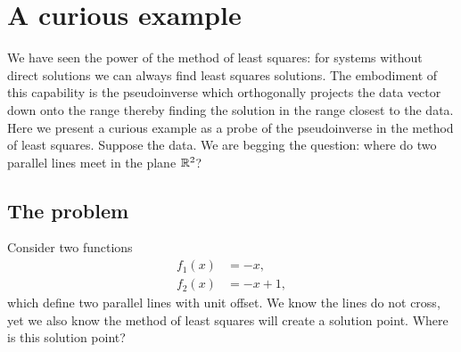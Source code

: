 \section{A curious example}

We have seen the power of the method of least squares: for systems without direct solutions we can always find least squares solutions. The embodiment of this capability is the pseudoinverse which orthogonally projects the data vector down onto the range thereby finding the solution in the range closest to the data. Here we present a curious example as a probe of the pseudoinverse in the method of least squares. Suppose the data. We are begging the question: where do two parallel lines meet in the plane $\mathbb{R}^{2}$?

\subsection{The problem}
Consider two functions
\begin{equation}
\begin{split}
  f_{1}(x) &= -x,\\
  f_{2}(x) &= -x + 1,
\end{split}
\end{equation}
which define two parallel lines with unit offset. We know the lines do not cross, yet we also know the method of least squares will create a solution point. Where is this solution point?

